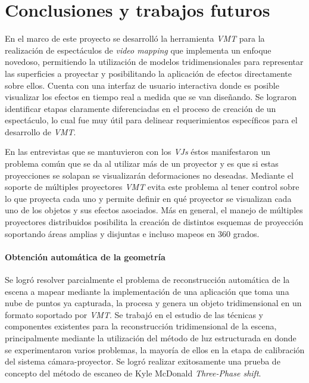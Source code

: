 ﻿\chapter{Conclusiones y trabajos futuros}

En el marco de este proyecto se desarrolló la herramienta \emph{VMT} para la realización de espectáculos de \emph{video mapping} que implementa un enfoque novedoso, permitiendo la utilización de modelos tridimensionales para representar las superficies a proyectar y posibilitando la aplicación de efectos directamente sobre ellos. Cuenta con una interfaz de usuario interactiva donde es posible visualizar los efectos en tiempo real a medida que se van diseñando.
Se lograron identificar etapas claramente diferenciadas en el proceso de creación de un espectáculo, lo cual fue muy útil para delinear requerimientos específicos para el desarrollo de \emph{VMT}. 

En las entrevistas que se mantuvieron con los \emph{VJs} éstos manifestaron un problema común que se da al utilizar más de un proyector y es que si estas proyecciones se solapan se visualizarán deformaciones no deseadas. Mediante el soporte de múltiples proyectores \emph{VMT} evita este problema al tener control sobre lo que proyecta cada uno y permite definir en qué proyector se visualizan cada uno de los objetos y sus efectos asociados. Más en general, el manejo de múltiples proyectores distribuidos posibilita la creación de distintos esquemas de proyección soportando áreas amplias y disjuntas e incluso mapeos en 360 grados.

\subsubsection{Obtención automática de la geometría}

Se logró resolver parcialmente el problema de reconstrucción automática de la escena a mapear mediante la implementación de una aplicación que toma una nube de puntos ya capturada, la procesa y genera un objeto tridimensional en un formato soportado por \emph{VMT}.
Se trabajó en el estudio de las técnicas y componentes existentes para la reconstrucción tridimensional de la escena, principalmente mediante la utilización del método de luz estructurada en donde se experimentaron varios problemas, la mayoría de ellos en la etapa de calibración del sistema cámara-proyector. 
Se logró realizar exitosamente una prueba de concepto del método de escaneo de Kyle McDonald \emph{Three-Phase shift}.

